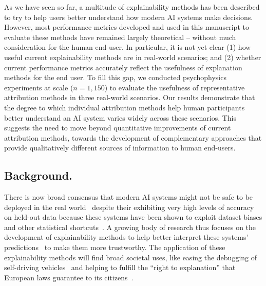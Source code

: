 
\newcommand{\metapred}{\bm{\psi}}
\newcommand{\metabase}{\bm{\psi}^{(0)}}
\newcommand{\method}{\explainer}
\newcommand{\complexity}{\textit{Complexity}}

\renewcommand{\mp}{Meta-predictor}

\newcommand{\expsa}{Saliency}
\newcommand{\expgi}{Gradient $\odot$ Input}
\newcommand{\expig}{Integrated Gradients}
\newcommand{\expsg}{SmoothGrad}
\newcommand{\expgc}{Grad-CAM}
\newcommand{\expoc}{Occlusion}

As we have seen so far, a multitude of explainability methods has been described to try to help users better understand how modern AI systems make decisions. However, most performance metrics developed and used in this manuscript to evaluate these methods have remained largely theoretical -- without much consideration for the human end-user. In particular, it is not yet clear (1) how useful current explainability methods are in real-world scenarios; and (2) whether current performance metrics accurately reflect the usefulness of explanation methods for the end user. To fill this gap, we conducted psychophysics experiments at scale ($n=1,150$) to evaluate the usefulness of representative attribution methods in three real-world scenarios. Our results demonstrate that the degree to which individual attribution methods help human participants better understand an AI system varies widely across these scenarios. This suggests the need to move beyond quantitative improvements of current attribution methods, towards the development of complementary approaches that provide qualitatively different sources of information to human end-users.


\subsection{Background.}

There is now broad consensus that modern AI systems might not be safe to be deployed in the real world~\cite{deel2021whitepaper} despite their exhibiting very high levels of accuracy on held-out data because these systems have been shown to exploit dataset biases and other statistical shortcuts~\cite{geirhos2020shortcut, d2020underspecification, shahamatdar2022deceptivelearning, fel2022aligning,moayeri2021sample,moayeri2022comprehensive,moayeri2022hard,moayeriexplicit}. A growing body of research thus focuses on the development of explainability methods to help better interpret these systems' predictions~\cite{ribeiro2016lime, sundararajan2017axiomatic, smilkov2017smoothgrad, petsiuk2018rise, selvaraju2017gradcam, linsley2018learning, fel2021sobol, eva2, novello2022making} to make them more trustworthy. The application of these explainability methods will find broad societal uses, like easing the debugging of self-driving vehicles~\cite{zablocki2021explainability} 
and helping to fulfill the ``right to explanation'' that European laws guarantee to its citizens~\cite{goodman2017european}.

